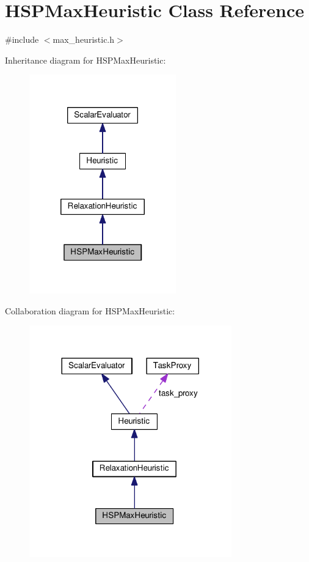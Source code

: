 \hypertarget{classHSPMaxHeuristic}{\section{H\-S\-P\-Max\-Heuristic Class Reference}
\label{classHSPMaxHeuristic}
}


{\ttfamily \#include $<$max\-\_\-heuristic.\-h$>$}



Inheritance diagram for H\-S\-P\-Max\-Heuristic\-:
\nopagebreak
\begin{figure}[H]
\begin{center}
\leavevmode
\includegraphics[width=180pt]{classHSPMaxHeuristic__inherit__graph}
\end{center}
\end{figure}


Collaboration diagram for H\-S\-P\-Max\-Heuristic\-:
\nopagebreak
\begin{figure}[H]
\begin{center}
\leavevmode
\includegraphics[width=248pt]{classHSPMaxHeuristic__coll__graph}
\end{center}
\end{figure}
